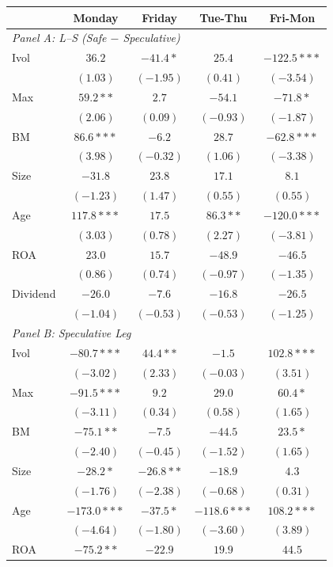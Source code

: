 \centering
\footnotesize
\begin{tabular}{l c c c c}
\toprule
 & Monday & Friday & Tue-Thu & Fri-Mon \\
\midrule
\multicolumn{5}{l}{\textit{Panel A: L--S (Safe $-$ Speculative)}} \\
Ivol & $36.2$ & $-41.4*$ & $25.4$ & $-122.5***$ \\
 & $(1.03)$ & $(-1.95)$ & $(0.41)$ & $(-3.54)$ \\
Max & $59.2**$ & $2.7$ & $-54.1$ & $-71.8*$ \\
 & $(2.06)$ & $(0.09)$ & $(-0.93)$ & $(-1.87)$ \\
BM & $86.6***$ & $-6.2$ & $28.7$ & $-62.8***$ \\
 & $(3.98)$ & $(-0.32)$ & $(1.06)$ & $(-3.38)$ \\
Size & $-31.8$ & $23.8$ & $17.1$ & $8.1$ \\
 & $(-1.23)$ & $(1.47)$ & $(0.55)$ & $(0.55)$ \\
Age & $117.8***$ & $17.5$ & $86.3**$ & $-120.0***$ \\
 & $(3.03)$ & $(0.78)$ & $(2.27)$ & $(-3.81)$ \\
ROA & $23.0$ & $15.7$ & $-48.9$ & $-46.5$ \\
 & $(0.86)$ & $(0.74)$ & $(-0.97)$ & $(-1.35)$ \\
Dividend & $-26.0$ & $-7.6$ & $-16.8$ & $-26.5$ \\
 & $(-1.04)$ & $(-0.53)$ & $(-0.53)$ & $(-1.25)$ \\
\midrule
\multicolumn{5}{l}{\textit{Panel B: Speculative Leg}} \\
Ivol & $-80.7***$ & $44.4**$ & $-1.5$ & $102.8***$ \\
 & $(-3.02)$ & $(2.33)$ & $(-0.03)$ & $(3.51)$ \\
Max & $-91.5***$ & $9.2$ & $29.0$ & $60.4*$ \\
 & $(-3.11)$ & $(0.34)$ & $(0.58)$ & $(1.65)$ \\
BM & $-75.1**$ & $-7.5$ & $-44.5$ & $23.5*$ \\
 & $(-2.40)$ & $(-0.45)$ & $(-1.52)$ & $(1.65)$ \\
Size & $-28.2*$ & $-26.8**$ & $-18.9$ & $4.3$ \\
 & $(-1.76)$ & $(-2.38)$ & $(-0.68)$ & $(0.31)$ \\
Age & $-173.0***$ & $-37.5*$ & $-118.6***$ & $108.2***$ \\
 & $(-4.64)$ & $(-1.80)$ & $(-3.60)$ & $(3.89)$ \\
ROA & $-75.2**$ & $-22.9$ & $19.9$ & $44.5$ \\

\end{tabular}
